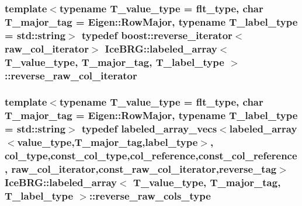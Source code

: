 \subsubsection[{reverse\+\_\+raw\+\_\+col\+\_\+iterator}]{\setlength{\rightskip}{0pt plus 5cm}template$<$typename T\+\_\+value\+\_\+type = flt\+\_\+type, char T\+\_\+major\+\_\+tag = Eigen\+::\+Row\+Major, typename T\+\_\+label\+\_\+type = std\+::string$>$ typedef boost\+::reverse\+\_\+iterator$<${\bf raw\+\_\+col\+\_\+iterator}$>$ {\bf Ice\+B\+R\+G\+::labeled\+\_\+array}$<$ T\+\_\+value\+\_\+type, T\+\_\+major\+\_\+tag, T\+\_\+label\+\_\+type $>$\+::{\bf reverse\+\_\+raw\+\_\+col\+\_\+iterator}}\label{classIceBRG_1_1labeled__array_a5c4132b2acc103385909ec165cd1a040}
\hypertarget{classIceBRG_1_1labeled__array_a38a503b3f572b6be9ec11f817f61bb17}{}
\subsubsection[{reverse\+\_\+raw\+\_\+cols\+\_\+type}]{\setlength{\rightskip}{0pt plus 5cm}template$<$typename T\+\_\+value\+\_\+type = flt\+\_\+type, char T\+\_\+major\+\_\+tag = Eigen\+::\+Row\+Major, typename T\+\_\+label\+\_\+type = std\+::string$>$ typedef {\bf labeled\+\_\+array\+\_\+vecs}$<${\bf labeled\+\_\+array}$<${\bf value\+\_\+type},T\+\_\+major\+\_\+tag,{\bf label\+\_\+type}$>$, {\bf col\+\_\+type},{\bf const\+\_\+col\+\_\+type},{\bf col\+\_\+reference},{\bf const\+\_\+col\+\_\+reference}, {\bf raw\+\_\+col\+\_\+iterator},{\bf const\+\_\+raw\+\_\+col\+\_\+iterator},{\bf reverse\+\_\+tag}$>$ {\bf Ice\+B\+R\+G\+::labeled\+\_\+array}$<$ T\+\_\+value\+\_\+type, T\+\_\+major\+\_\+tag, T\+\_\+label\+\_\+type $>$\+::{\bf reverse\+\_\+raw\+\_\+cols\+\_\+type}}\label{classIceBRG_1_1labeled__array_a38a503b3f572b6be9ec11f817f61bb17}
\hypertarget{classIceBRG_1_1labeled__array_a211a4c8c7435da2eea6481b434bfdef1}{}
